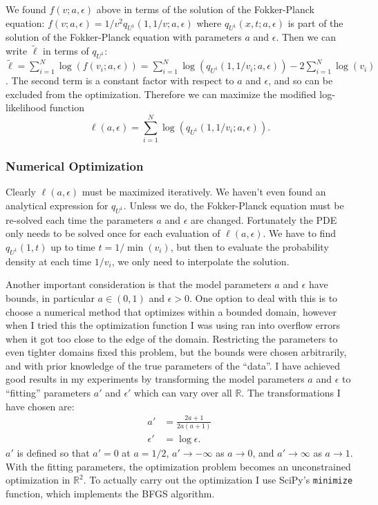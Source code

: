 \documentclass{article}
\def\R{\mathbb{R}}
\begin{document}
We found $f(v; a, \epsilon)$ above in terms of the solution of the
Fokker-Planck equation: $f(v; a, \epsilon) = 1/v^2 q_{U^1}(1, 1/v; a,
\epsilon)$ where $q_{U^1}(x, t; a, \epsilon)$ is part of the solution
of the Fokker-Planck equation with parameters $a$ and $\epsilon$. Then
we can write $\tilde{\ell}$ in terms of $q_{U^1}$:
$\tilde{\ell} = \sum_{i=1}^N \log(f(v_i; a, \epsilon)) = \sum_{i=1}^N
\log(q_{U^1}(1, 1/v_i; a, \epsilon)) - 2\sum_{i=1}^N \log(v_i)$. The
second term is a constant factor with respect to $a$ and $\epsilon$,
and so can be excluded from the optimization. Therefore we can
maximize the modified log-likelihood function
\begin{equation}
  \label{eq:mod-log-like}
  \ell(a, \epsilon) = \sum_{i=1}^N \log(q_{U^1}(1, 1/v_i; a, \epsilon)).
\end{equation}

\subsubsection{Numerical Optimization}
\label{sec:numer-optim}

Clearly $\ell(a, \epsilon)$ must be maximized iteratively. We haven't
even found an analytical expression for $q_{U^1}$. Unless we do, the
Fokker-Planck equation must be re-solved each time the parameters $a$
and $\epsilon$ are changed. Fortunately the PDE only needs to be
solved once for each evaluation of $\ell(a, \epsilon)$. We have to
find $q_{U^1}(1, t)$ up to time $t = 1/\min(v_i)$, but then to
evaluate the probability density at each time $1/v_i$, we only need to
interpolate the solution.

Another important consideration is that the model parameters $a$ and
$\epsilon$ have bounds, in particular $a \in (0, 1)$ and
$\epsilon > 0$. One option to deal with this is to choose a numerical
method that optimizes within a bounded domain, however when I tried
this the optimization function I was using ran into overflow errors
when it got too close to the edge of the domain. Restricting the
parameters to even tighter domains fixed this problem, but the bounds
were chosen arbitrarily, and with prior knowledge of the true
parameters of the ``data''. I have achieved good results in my
experiments by transforming the model parameters $a$ and $\epsilon$ to
``fitting'' parameters $a'$ and $\epsilon'$ which can vary over all
$\R$. The transformations I have chosen are:
\begin{align}
  \label{eq:a-fwd-trns}
  a' &= \frac{2a + 1}{2a(a + 1)} \\
  \label{eq:e-fwd-trns}
  \epsilon' &= \log \epsilon.
\end{align}
$a'$ is defined so that $a'=0$ at $a=1/2$, $a' \rightarrow -\infty$ as
$a \rightarrow 0$, and $a' \rightarrow \infty$ as $a \rightarrow
1$. With the fitting parameters, the optimization problem becomes an
unconstrained optimization in $\R^2$. To actually carry out the
optimization I use SciPy's \verb|minimize| function, which implements
the BFGS algorithm.
\end{document}
